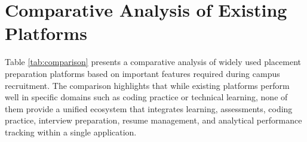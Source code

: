 \section{Comparative Analysis of Existing Platforms}

Table \ref{tab:comparison} presents a comparative analysis of widely used placement preparation platforms based on important features required during campus recruitment. The comparison highlights that while existing platforms perform well in specific domains such as coding practice or technical learning, none of them provide a unified ecosystem that integrates learning, assessments, coding practice, interview preparation, resume management, and analytical performance tracking within a single application.

\begin{table}[H]
\centering
\caption{Comparison of Existing Placement Preparation Platforms}
\label{tab:comparison}
\renewcommand{\arraystretch}{1.25}
\end{table}
